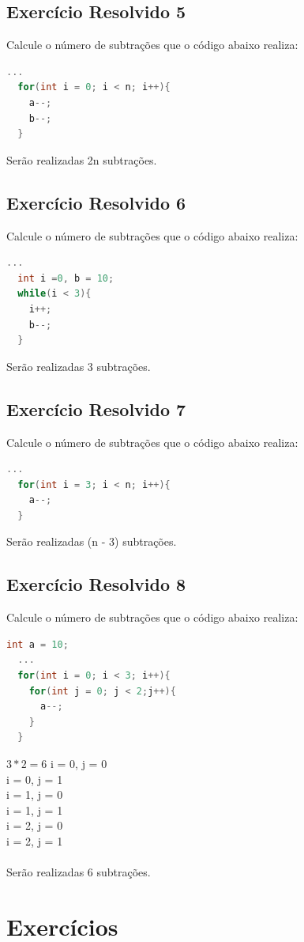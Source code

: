 \documentclass[12pt]{article}
\begin{document}
\subsection{Exercício Resolvido 5}
Calcule o número de subtrações que o código abaixo realiza:
\begin{lstlisting}[language=C]
  ...
  for(int i = 0; i < n; i++){
    a--;
    b--;
  }
\end{lstlisting}
Serão realizadas 2n subtrações.

\subsection{Exercício Resolvido 6}
Calcule o número de subtrações que o código abaixo realiza:
\begin{lstlisting}[language=C]
  ...
  int i =0, b = 10;
  while(i < 3){
    i++;
    b--;
  }
\end{lstlisting}
Serão realizadas 3 subtrações.

\subsection{Exercício Resolvido 7}
Calcule o número de subtrações que o código abaixo realiza:
\begin{lstlisting}[language=C]
  ...
  for(int i = 3; i < n; i++){
    a--;
  }
\end{lstlisting}
Serão realizadas (n - 3) subtrações.

\subsection{Exercício Resolvido 8}
Calcule o número de subtrações que o código abaixo realiza:
\begin{lstlisting}[language=C]
  int a = 10;
  ...
  for(int i = 0; i < 3; i++){
    for(int j = 0; j < 2;j++){
      a--;
    }
  }
\end{lstlisting}
$3 * 2 = 6$
  i = 0, j = 0\\
  i = 0, j = 1\\
  i = 1, j = 0\\
  i = 1, j = 1\\
  i = 2, j = 0\\
  i = 2, j = 1\\
\\Serão realizadas 6 subtrações.

\section{Exercícios}
\end{document}

